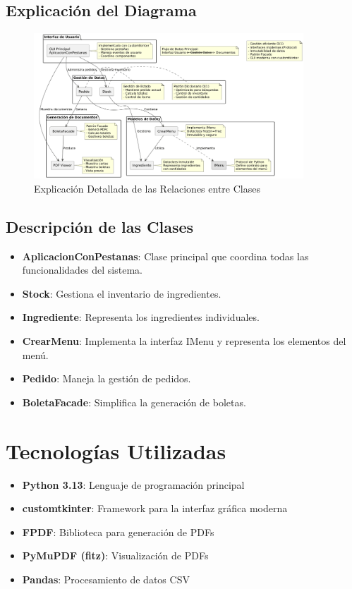 \documentclass[12pt,letterpaper]{article}
\begin{document}
\subsection{Explicación del Diagrama}
\begin{figure}[H]
    \centering
    \includegraphics[width=0.9\textwidth]{./images/explicacion_diagrama.png}
    \caption{Explicación Detallada de las Relaciones entre Clases}\label{fig:explicacion-diagrama}
\end{figure}
\clearpage %

\subsection{Descripción de las Clases}
\begin{itemize}
    \item \textbf{AplicacionConPestanas}: Clase principal que coordina todas las funcionalidades del sistema.
    \item \textbf{Stock}: Gestiona el inventario de ingredientes.
    \item \textbf{Ingrediente}: Representa los ingredientes individuales.
    \item \textbf{CrearMenu}: Implementa la interfaz IMenu y representa los elementos del menú.
    \item \textbf{Pedido}: Maneja la gestión de pedidos.
    \item \textbf{BoletaFacade}: Simplifica la generación de boletas.
\end{itemize}

\section{Tecnologías Utilizadas}
\begin{itemize}
    \item \textbf{Python 3.13}: Lenguaje de programación principal
    \item \textbf{customtkinter}: Framework para la interfaz gráfica moderna
    \item \textbf{FPDF}: Biblioteca para generación de PDFs
    \item \textbf{PyMuPDF (fitz)}: Visualización de PDFs
    \item \textbf{Pandas}: Procesamiento de datos CSV
\end{itemize}
\end{document}
